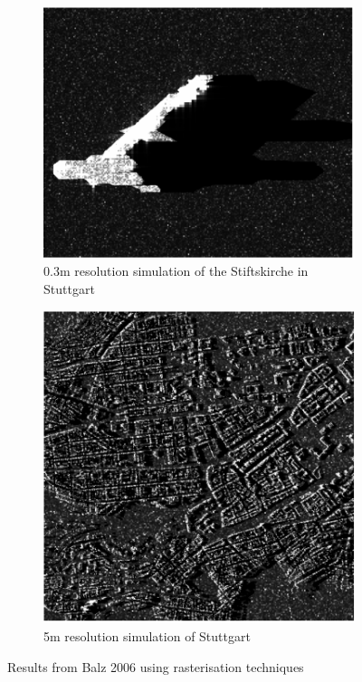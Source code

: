 \begin{figure}
\centering
\begin{subfigure}{.5\textwidth}
	\centering
	\includegraphics[width=0.7\linewidth]{../figures/balz_2006_stiftskirche}
	\caption{0.3m resolution simulation of the Stiftskirche in Stuttgart}
	\label{fig:balz_2006_stiftskirche}
\end{subfigure}%
\begin{subfigure}{.5\textwidth}
	\centering
	\includegraphics[width=0.7\linewidth]{../figures/balz_2006_stuttgart}	
	\caption{5m resolution simulation of Stuttgart}
	\label{fig:balz_2006_stuttgart}
\end{subfigure}
\caption{Results from Balz 2006 \cite{balzImprovedRealTimeSAR2006} using rasterisation techniques}
\label{fig:balz_2006_images}
	
\end{figure}

